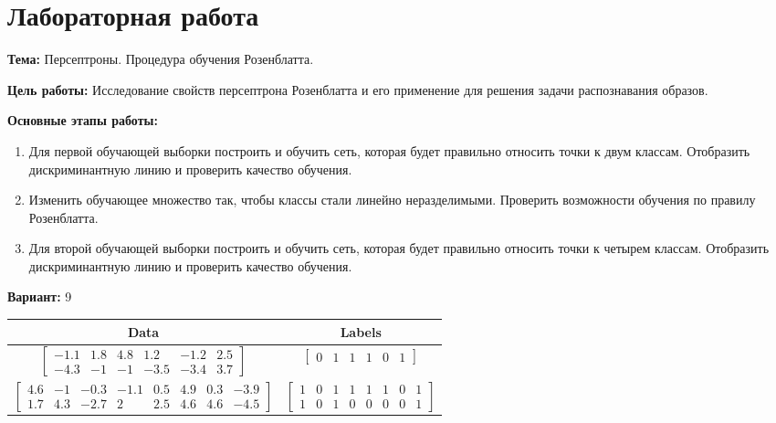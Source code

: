 \section*{Лабораторная работа }

{\bfseries Тема:} Персептроны. Процедура обучения Розенблатта.

{\bfseries Цель работы:} Исследование свойств персептрона Розенблатта и его применение для решения задачи распознавания образов.

{\bfseries Основные этапы работы:}
\begin{enumerate}
	\item Для первой обучающей выборки построить и обучить сеть, которая будет правильно относить точки к двум классам. Отобразить дискриминантную линию и проверить качество обучения.
	\item Изменить обучающее множество так, чтобы классы стали линейно неразделимыми. Проверить возможности обучения по правилу Розенблатта.
	\item Для второй обучающей выборки построить и обучить сеть, которая будет правильно относить точки к четырем классам. Отобразить дискриминантную линию и проверить качество обучения.
\end{enumerate}

{\bfseries Вариант:} 9

\begin{center}
\begin{tabular}{|c|c|}
\hline
Data & Labels \\
\hline
$\begin{bmatrix}
-1.1 & 1.8 & 4.8 & 1.2 & -1.2 & 2.5 \\
-4.3 & -1 & -1 & -3.5 & -3.4 & 3.7
\end{bmatrix}$
&
$\begin{bmatrix}
0 & 1 & 1 & 1 & 0 & 1
\end{bmatrix}$ \\ [4ex]
$\begin{bmatrix}
4.6 & -1 & -0.3 & -1.1 & 0.5 & 4.9 & 0.3 & -3.9 \\
1.7 & 4.3 & -2.7 & 2 & 2.5 & 4.6 & 4.6 & -4.5
\end{bmatrix}$
&
$\begin{bmatrix}
1 & 0 & 1 & 1 & 1 & 1 & 0 & 1 \\
1 & 0 & 1 & 0 & 0 & 0 & 0 & 1
\end{bmatrix}$ \\
\hline
\end{tabular}
\end{center}
\pagebreak
